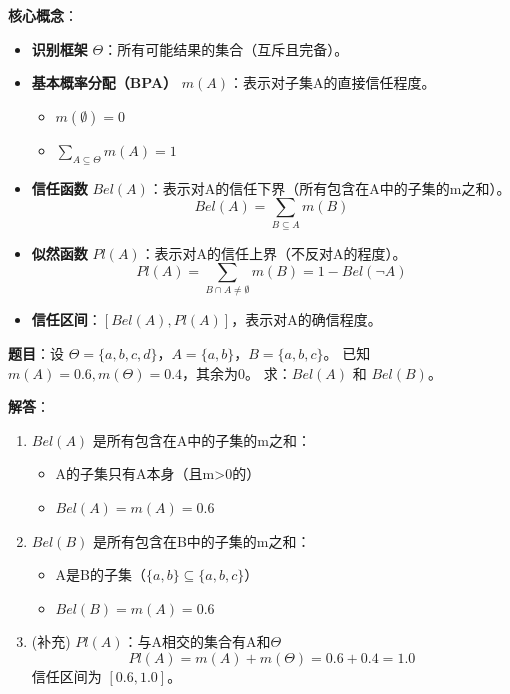 \begin{conceptbox}
\textbf{核心概念}：
\begin{itemize}[itemsep=0pt]
    \item \textbf{识别框架} $\Theta$：所有可能结果的集合（互斥且完备）。
    \item \textbf{基本概率分配（BPA）} $m(A)$：表示对子集A的直接信任程度。
    \begin{itemize}
        \item $m(\emptyset) = 0$
        \item $\sum_{A \subseteq \Theta} m(A) = 1$
    \end{itemize}
    \item \textbf{信任函数} $Bel(A)$：表示对A的信任下界（所有包含在A中的子集的m之和）。
    $$Bel(A) = \sum_{B \subseteq A} m(B)$$
    \item \textbf{似然函数} $Pl(A)$：表示对A的信任上界（不反对A的程度）。
    $$Pl(A) = \sum_{B \cap A \neq \emptyset} m(B) = 1 - Bel(\neg A)$$
    \item \textbf{信任区间}：$[Bel(A), Pl(A)]$，表示对A的确信程度。
\end{itemize}
\end{conceptbox}

\begin{examplebox}[例题3.20 D-S理论计算]
\textbf{题目}：设 $\Theta = \{a, b, c, d\}$，$A=\{a, b\}$，$B=\{a, b, c\}$。
已知 $m(A) = 0.6, m(\Theta) = 0.4$，其余为0。
求：$Bel(A)$ 和 $Bel(B)$。

\tcblower
\textbf{解答}：
\begin{enumerate}[itemsep=0pt]
    \item $Bel(A)$ 是所有包含在A中的子集的m之和：
    \begin{itemize}
        \item A的子集只有A本身（且m>0的）
        \item $Bel(A) = m(A) = 0.6$
    \end{itemize}
    \item $Bel(B)$ 是所有包含在B中的子集的m之和：
    \begin{itemize}
        \item A是B的子集（$\{a,b\} \subseteq \{a,b,c\}$）
        \item $Bel(B) = m(A) = 0.6$
    \end{itemize}
    \item (补充) $Pl(A)$：与A相交的集合有A和$\Theta$
    $$Pl(A) = m(A) + m(\Theta) = 0.6 + 0.4 = 1.0$$
    信任区间为 $[0.6, 1.0]$。
\end{enumerate}
\end{examplebox}

